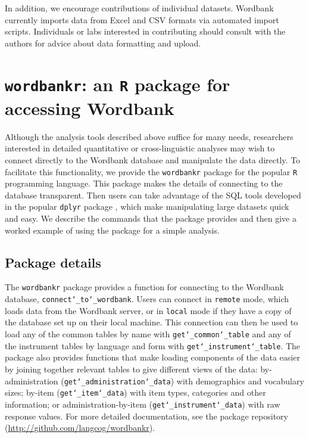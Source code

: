 \documentclass[doc,noapacite]{apa2}
\begin{document}
In addition, we encourage contributions of individual datasets. Wordbank currently imports data from Excel and CSV formats via automated import scripts. Individuals or labs interested in contributing should consult with the authors for advice about data formatting and upload. 

\section{\texttt{wordbankr}: an \texttt{R} package for accessing Wordbank}

Although the analysis tools described above suffice for many needs, researchers interested in detailed quantitative or cross-linguistic analyses may wish to connect directly to the Wordbank database and manipulate the data directly. To facilitate this functionality, we provide the \texttt{wordbankr} package for the popular \texttt{R} programming language. This package makes the details of connecting to the database transparent. Then users can take advantage of the SQL tools developed in the popular \texttt{dplyr} package \cite{wickham2014}, which make manipulating large datasets quick and easy. We describe the commands that the package provides and then give a worked example of using the package for a simple analysis.

\subsection{Package details}

The \texttt{wordbankr} package provides a function for connecting to the Wordbank database, \texttt{connect\char`_to\char`_wordbank}. Users can connect in \texttt{remote} mode, which loads data from the Wordbank server, or in \texttt{local} mode if they have a copy of the database set up on their local machine. This connection can then be used to load any of the common tables by name with \texttt{get\char`_common\char`_table} and any of the instrument tables by language and form with \texttt{get\char`_instrument\char`_table}. The package also provides functions that make loading components of the data easier by joining together relevant tables to give different views of the data: by-administration (\texttt{get\char`_administration\char`_data}) with demographics and vocabulary sizes; by-item (\texttt{get\char`_item\char`_data}) with item types, categories and other information; or administration-by-item (\texttt{get\char`_instrument\char`_data}) with raw response values. For more detailed documentation, see the package repository (\url{http://github.com/langcog/wordbankr}).
\end{document}
